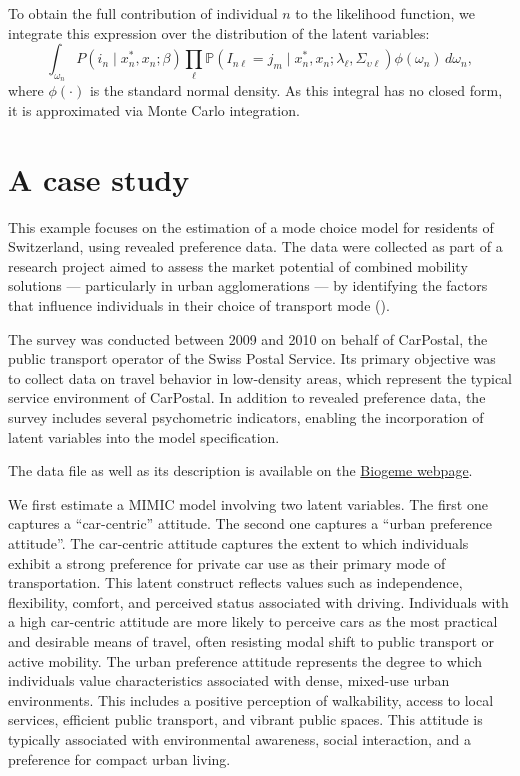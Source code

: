 \documentclass[12pt,a4paper]{article}
\begin{document}
To obtain the full contribution of individual \( n \) to the likelihood function, we integrate this expression over the distribution of the latent variables:
\[
\int_{\omega_n} P(i_n \mid x_n^*, x_n; \beta) \prod_\ell \mathbb{P}(I_{n\ell} = j_m \mid x_n^*, x_n; \lambda_\ell, \Sigma_{\upsilon \ell}) \phi(\omega_n) \, d\omega_n,
\]
where \( \phi(\cdot) \) is the standard normal density. As this integral has no closed form, it is approximated via Monte Carlo integration.

\section{A case study}
\label{sec:example}
This example focuses on the estimation of a mode choice model for
residents of Switzerland, using revealed preference data. The data
were collected as part of a research project aimed to assess the market potential
of combined mobility solutions --- particularly in urban agglomerations --- by
identifying the factors that influence individuals in their choice of
transport mode (\cite{OptimaRP2011}).

The survey was conducted between 2009 and 2010 on behalf of CarPostal,
the public transport operator of the Swiss Postal Service. Its primary
objective was to collect data on travel behavior in low-density areas,
which represent the typical service environment of CarPostal. In
addition to revealed preference data, the survey includes several
psychometric indicators, enabling the incorporation of latent
variables into the model specification.

The data file as well as its description is available on the \href{http://biogeme.epfl.ch/#data}{Biogeme webpage}.

We first  estimate a MIMIC model involving two latent variables. The
first one captures a ``car-centric'' attitude. The second one captures
a ``urban preference attitude''. The car-centric attitude captures the
extent to which individuals exhibit a strong preference for private
car use as their primary mode of transportation. This latent construct
reflects values such as independence, flexibility, comfort, and
perceived status associated with driving. Individuals with a high
car-centric attitude are more likely to perceive cars as the most
practical and desirable means of travel, often resisting modal shift
to public transport or active mobility. The urban preference attitude
represents the degree to which individuals value characteristics
associated with dense, mixed-use urban environments. This includes a
positive perception of walkability, access to local services,
efficient public transport, and vibrant public spaces. This attitude
is typically associated with environmental awareness, social
interaction, and a preference for compact urban living.
\end{document}
